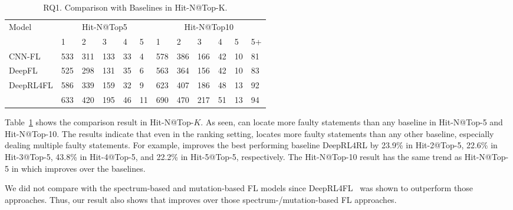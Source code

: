 \begin{table}[t]
	\caption{RQ1. Comparison with Baselines in Hit-N@Top-K.}
        \vspace{-6pt}
	{\small
		\begin{center}
			\renewcommand{\arraystretch}{1}
			\begin{tabular}{p{1.5cm}<{\centering}|p{0.3cm}<{\centering}|p{0.3cm}<{\centering}|p{0.3cm}<{\centering}|p{0.2cm}<{\centering}|p{0.2cm}<{\centering}|p{0.3cm}<{\centering}|p{0.3cm}<{\centering}|p{0.3cm}<{\centering}|p{0.2cm}<{\centering}|p{0.2cm}<{\centering}|p{0.2cm}<{\centering}}
				\hline
				\multirow{2}{*}{Model}    & \multicolumn{5}{c|}{Hit-N@Top5}& \multicolumn{6}{c}{Hit-N@Top10}\\
				\cline{2-12}
											 &1&2&3&4&5&1&2&3&4&5&5+\\
				
				\hline
				CNN-FL      & 533 & 311 & 133 & 33 & 4 & 578 & 386 & 166 & 42 & 10 & 81 \\
				DeepFL		& 525 & 298 & 131 & 35 & 6 & 563 & 364 & 156 & 42 & 10 & 83 \\
				DeepRL4FL	& 586 & 339 & 159 & 32 & 9 & 623 & 407 & 186 & 48 & 13 & 92 \\
				\hline
				\tool       & 633 & 420 & 195 & 46 & 11& 690 & 470 & 217 & 51 & 13 & 94 \\
				\hline
			\end{tabular}
			
			\label{fig:rq1-2}
		\end{center}
	}
\end{table}

Table~\ref{fig:rq1-2} shows the comparison result in Hit-N@Top-$K$.
As seen, {\tool} can locate more faulty statements than any baseline
in Hit-N@Top-5 and Hit-N@Top-10. The results indicate that even in the
ranking setting, {\tool} locates more faulty statements than
any other baseline, especially dealing multiple faulty statements. For
example, {\tool} improves the best performing baseline DeepRL4RL by
23.9\% in Hit-2@Top-5, 22.6\% in Hit-3@Top-5, 43.8\% in Hit-4@Top-5,
and 22.2\% in Hit-5@Top-5, respectively. The Hit-N@Top-10 result has
the same trend as Hit-N@Top-5 in which {\tool} improves over the
baselines.

We did not compare with the spectrum-based and mutation-based FL
models since DeepRL4FL~\cite{icse21-fl} was shown to outperform
those approaches. Thus, our result also shows that {\tool}
improves over those spectrum-/mutation-based FL approaches.
